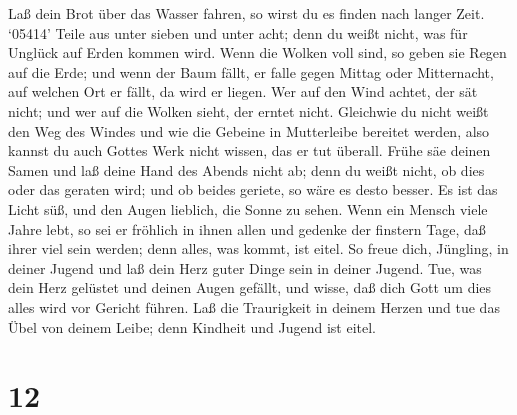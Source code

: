  Laß dein Brot über das Wasser fahren, so wirst du es finden
nach langer Zeit.  `05414' Teile aus unter sieben und unter
acht; denn du weißt nicht, was für Unglück auf Erden kommen wird.
 Wenn die Wolken voll sind, so geben sie Regen auf die Erde;
und wenn der Baum fällt, er falle gegen Mittag oder Mitternacht, auf
welchen Ort er fällt, da wird er liegen.  Wer auf den Wind
achtet, der sät nicht; und wer auf die Wolken sieht, der erntet nicht.
 Gleichwie du nicht weißt den Weg des Windes und wie die
Gebeine in Mutterleibe bereitet werden, also kannst du auch Gottes Werk
nicht wissen, das er tut überall.  Frühe säe deinen Samen
und laß deine Hand des Abends nicht ab; denn du weißt nicht, ob dies
oder das geraten wird; und ob beides geriete, so wäre es desto besser.
 Es ist das Licht süß, und den Augen lieblich, die Sonne zu
sehen.  Wenn ein Mensch viele Jahre lebt, so sei er fröhlich
in ihnen allen und gedenke der finstern Tage, daß ihrer viel sein
werden; denn alles, was kommt, ist eitel.  So freue dich,
Jüngling, in deiner Jugend und laß dein Herz guter Dinge sein in deiner
Jugend. Tue, was dein Herz gelüstet und deinen Augen gefällt, und wisse,
daß dich Gott um dies alles wird vor Gericht führen.  Laß
die Traurigkeit in deinem Herzen und tue das Übel von deinem Leibe; denn
Kindheit und Jugend ist eitel.

\hypertarget{section-11}{%
\section{12}\label{section-11}}

